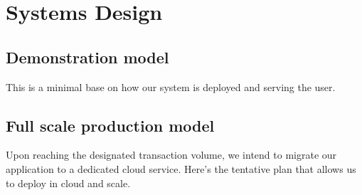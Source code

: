 \section{Systems Design}


\subsection{Demonstration model}


This is a minimal base on how our system is deployed and serving the user.

\subsection{Full scale production model}


Upon reaching the designated transaction volume, we intend to migrate our application to a dedicated cloud service. Here's the tentative plan that allows us to deploy in cloud and scale.

\clearpage
